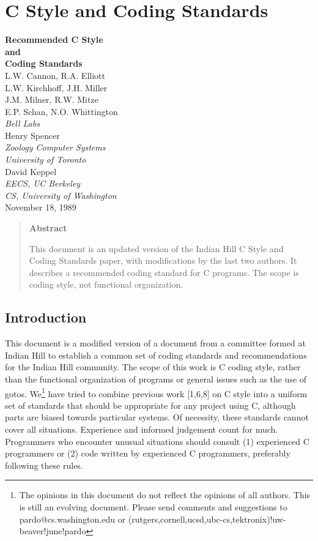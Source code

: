\cleardoublepage
\chapter{C Style and Coding Standards}
\label{style}
\begin{center}
{\LARGE\bf Recommended C Style\\
and\\
Coding Standards\\[1cm]}
L.W. Cannon, R.A. Elliott\\
L.W. Kirchhoff, J.H. Miller\\
J.M. Milner, R.W. Mitze\\
E.P. Schan, N.O. Whittington\\
{\it Bell Labs}\\[\baselineskip]
Henry Spencer\\
{\it Zoology Computer Systems}\\
{\it University of Toronto}\\[\baselineskip]
David Keppel\\
{\it EECS, UC Berkeley}\\
{\it CS, University of Washington}\\[.5cm]
November 18, 1989
\end{center}
\begin{quote}
{\bf Abstract}

This document is an updated version of the Indian Hill C Style and Coding 
Standards paper, with modifications by the last two authors. It describes a 
recommended coding standard for C programs. The scope is coding style, not 
functional organization. 
\end{quote}
\newpage
\section{Introduction}
 This document is a modified version of a document from a committee formed at
Indian Hill to establish a common set of coding standards and recommendations
for the Indian Hill community. The scope of this work is C coding style, rather
than the functional organization of programs or general issues such as the use
of gotos. We\footnote{The opinions in this document do not reflect the opinions
of all authors.  This is still an evolving document.  Please send comments and
suggestions to pardo@cs.washington.edu or
(rutgers,cornell,ucsd,ubc-cs,tektronix)!uw-beaver!june!pardo}
  have tried to combine previous work [1,6,8] on C style into a
uniform set of standards that should be appropriate for any project using C,
although parts are biased towards particular systems. Of necessity, these
standards cannot cover all situations. Experience and informed judgement count
for much. Programmers who encounter unusual situations should consult (1)
experienced C programmers or (2) code written by experienced C programmers,
preferably following these rules. 

